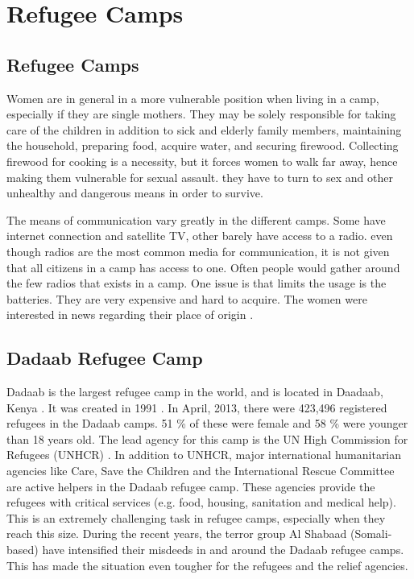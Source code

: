 \chapter{Refugee Camps}
\label{chp:refugeecamps} 

\section{Refugee Camps}

Women are in general in a more vulnerable position when living in a  camp, especially if they are single mothers. They may be solely responsible for taking care of the children in addition to sick and elderly family members, maintaining the household, preparing food, acquire water, and securing firewood. Collecting firewood for cooking is a necessity, but it forces women  to walk far away, hence making them vulnerable for sexual assault. they have to turn to sex and other unhealthy and dangerous means in order to survive. \cite{womenRefugee} 


The means of communication vary greatly in the different camps. Some have internet connection and satellite TV, other barely have access to a radio. even though radios are the most common media for communication, it is not given that all citizens in a camp has access to one. Often people would gather around the few radios that exists in a camp. One issue is that limits the usage is the batteries. They are very expensive and hard to acquire. The women were interested in news regarding their place of origin \cite{womenRefugee}. 



\section{Dadaab Refugee Camp}
Dadaab is the largest refugee camp in the world, and is located in Daadaab, Kenya \cite{dadaab}. It was created in 1991 \cite{dadaabcare}. In April, 2013, there were 423,496 registered refugees in the Dadaab camps. 51 \% of these were female and 58 \% were younger than 18 years old. The lead agency for this camp is the UN High Commission for Refugees (UNHCR) \cite{dadaab}. In addition to UNHCR, major international humanitarian agencies like Care, Save the Children and the International Rescue Committee  are active helpers in the Dadaab refugee camp. These agencies provide the refugees with critical services (e.g. food, housing, sanitation and medical help). This is an extremely challenging task in refugee camps, especially when they reach this size. During the recent years, the terror group Al Shabaad (Somali-based) have intensified their misdeeds in and around the Dadaab refugee camps. This has made the situation even tougher for the refugees and the relief agencies. 


